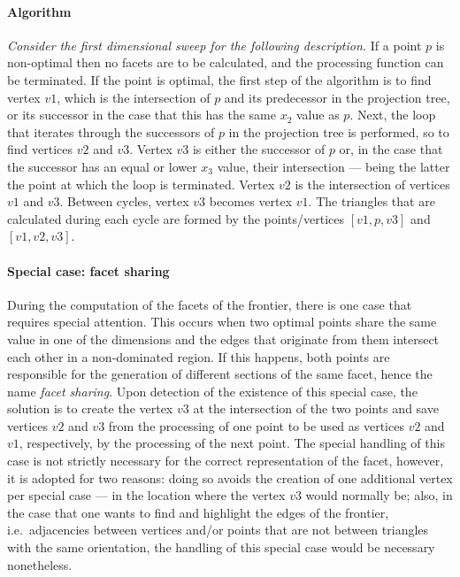 

\paragraph{Algorithm} \textit{Consider the first dimensional sweep for the following description.} If a point $p$ is non-optimal then no facets are to be calculated, and the processing function can be terminated. If the point is optimal, the first step of the algorithm is to find vertex $v1$, which is the intersection of $p$ and its predecessor in the projection tree, or its successor in the case that this has the same $x_2$ value as $p$. Next, the loop that iterates through the successors of $p$ in the projection tree is performed, so to find vertices $v2$ and $v3$. Vertex $v3$ is either the successor of $p$ or, in the case that the successor has an equal or lower $x_3$ value, their intersection --- being the latter the point at which the loop is terminated. Vertex $v2$ is the intersection of vertices $v1$ and $v3$. Between cycles, vertex $v3$ becomes vertex $v1$. The triangles that are calculated during each cycle are formed by the points/vertices $[v1,p,v3]$ and $[v1,v2,v3]$.

\paragraph{Special case: facet sharing} During the computation of the facets of the frontier, there is one case that requires special attention. This occurs when two optimal points share the same value in one of the dimensions and the edges that originate from them intersect each other in a non-dominated region. If this happens, both points are responsible for the generation of different sections of the same facet, hence the name \textit{facet sharing}. Upon detection of the existence of this special case, the solution is to create the vertex $v3$ at the intersection of the two points and save vertices $v2$ and $v3$ from the processing of one point to be used as vertices $v2$ and $v1$, respectively, by the processing of the next point. The special handling of this case is not strictly necessary for the correct representation of the facet, however, it is adopted for two reasons: doing so avoids the creation of one additional vertex per special case --- in the location where the vertex $v3$ would normally be; also, in the case that one wants to find and highlight the edges of the frontier, i.e.\ adjacencies between vertices and/or points that are not between triangles with the same orientation, the handling of this special case would be necessary nonetheless. 

